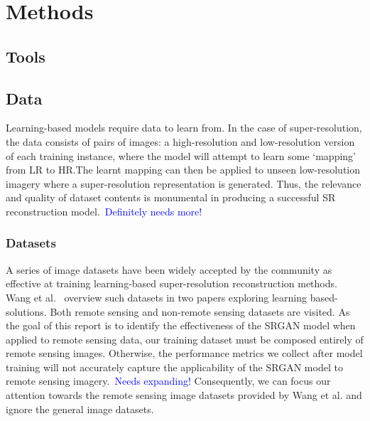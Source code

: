 \chapter{Methods}
\label{chapter2}

\section{Tools}

\section{Data}
Learning-based models require data to learn from. In the case of super-resolution, the data consists of pairs of images: a high-resolution and low-resolution version of each training instance, where the model will attempt to learn some `mapping' from LR to HR.\@ The learnt mapping can then be applied to unseen low-resolution imagery where a super-resolution representation is generated. Thus, the relevance and quality of dataset contents is monumental in producing a successful SR reconstruction model.\ \textcolor{blue}{Definitely needs more!}

\subsection{Datasets}
A series of image datasets have been widely accepted by the community as effective at training learning-based super-resolution reconstruction methods. Wang et al.~\cite{remoteSensingDeepLearningReview, remoteSensingGANsReview} overview such datasets in two papers exploring learning based-solutions. Both remote sensing and non-remote sensing datasets are visited. As the goal of this report is to identify the effectiveness of the SRGAN model when applied to remote sensing data, our training dataset must be composed entirely of remote sensing images. Otherwise, the performance metrics we collect after model training will not accurately capture the applicability of the SRGAN model to remote sensing imagery.\ \textcolor{blue}{Needs expanding!} Consequently, we can focus our attention towards the remote sensing image datasets provided by Wang et al. and ignore the general image datasets.

